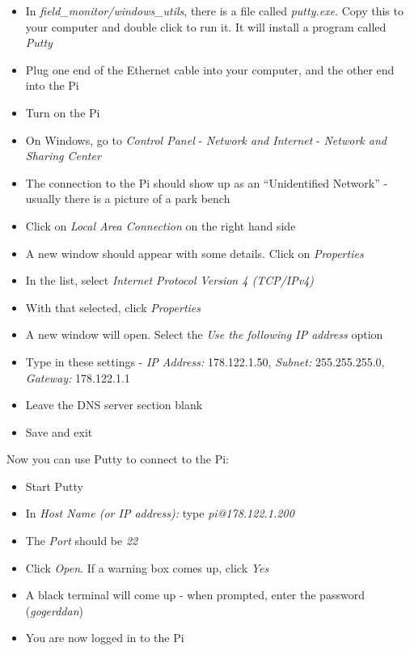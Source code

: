 \documentclass[10pt]{article}
\begin{document}
\begin{itemize}
 \item In \textit{field\_monitor/windows\_utils}, there is a file called \textit{putty.exe}. Copy this to your computer and double click to run it. It will install a program called \textit{Putty}
 \item Plug one end of the Ethernet cable into your computer, and the other end into the Pi
 \item Turn on the Pi
 \item On Windows, go to \textit{Control Panel} - \textit{Network and Internet} - \textit{Network and Sharing Center}
 \item The connection to the Pi should show up as an ``Unidentified Network'' - usually there is a picture of a park bench
 \item Click on \textit{Local Area Connection} on the right hand side
 \item A new window should appear with some details. Click on \textit{Properties}
 \item In the list, select \textit{Internet Protocol Version 4 (TCP/IPv4)}
 \item With that selected, click \textit{Properties}
 \item A new window will open. Select the \textit{Use the following IP address} option
 \item Type in these settings - \textit{IP Address:} 178.122.1.50, \textit{Subnet:} 255.255.255.0, \textit{Gateway:} 178.122.1.1
 \item Leave the DNS server section blank
 \item Save and exit
\end{itemize}

Now you can use Putty to connect to the Pi:

\begin{itemize}
 \item Start Putty
 \item In \textit{Host Name (or IP address):} type \textit{pi@178.122.1.200}
 \item The \textit{Port} should be \textit{22}
 \item Click \textit{Open}. If a warning box comes up, click \textit{Yes}
 \item A black terminal will come up - when prompted, enter the password (\textit{gogerddan})
 \item You are now logged in to the Pi
\end{itemize}
\end{document}
